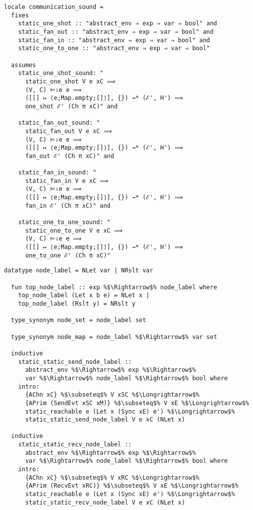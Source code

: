 \documentclass{article}
\begin{document}
\begin{lstlisting}[style=codestyle1, escapechar=\%]
locale communication_sound =
  fixes 
    static_one_shot :: "abstract_env ⇒ exp ⇒ var ⇒ bool" and
    static_fan_out :: "abstract_env ⇒ exp ⇒ var ⇒ bool" and 
    static_fan_in :: "abstract_env ⇒ exp ⇒ var ⇒ bool" and
    static_one_to_one :: "abstract_env ⇒ exp ⇒ var ⇒ bool"

  assumes 
    static_one_shot_sound: "
      static_one_shot V e xC ⟹
      (V, C) ⊨⇩e e ⟹
      ([[] ↦ ⟨e;Map.empty;[]⟩], {}) →* (ℰ', H') ⟹
      one_shot ℰ' (Ch π xC)" and

    static_fan_out_sound: "
      static_fan_out V e xC ⟹
      (V, C) ⊨⇩e e ⟹
      ([[] ↦ ⟨e;Map.empty;[]⟩], {}) →* (ℰ', H') ⟹
      fan_out ℰ' (Ch π xC)" and

    static_fan_in_sound: "
      static_fan_in V e xC ⟹
      (V, C) ⊨⇩e e ⟹
      ([[] ↦ ⟨e;Map.empty;[]⟩], {}) →* (ℰ', H') ⟹
      fan_in ℰ' (Ch π xC)" and

    static_one_to_one_sound: "
      static_one_to_one V e xC ⟹
      (V, C) ⊨⇩e e ⟹
      ([[] ↦ ⟨e;Map.empty;[]⟩], {}) →* (ℰ', H') ⟹
      one_to_one ℰ' (Ch π xC)"
  \end{lstlisting}



\begin{lstlisting}[style=codestyle1, escapechar=\%]
  datatype node_label = NLet var | NRslt var

  fun top_node_label :: exp %$\Rightarrow$% node_label where
    top_node_label (Let x b e) = NLet x |
    top_node_label (Rslt y) = NRslt y

  type_synonym node_set = node_label set

  type_synonym node_map = node_label %$\Rightarrow$% var set

  inductive
    static_static_send_node_label ::
      abstract_env %$\Rightarrow$% exp %$\Rightarrow$%
      var %$\Rightarrow$% node_label %$\Rightarrow$% bool where
    intro:
      {AChn xC} %$\subseteq$% V xSC %$\Longrightarrow$%
      {APrim (SendEvt xSC xM)} %$\subseteq$% V xE %$\Longrightarrow$%
      static_reachable e (Let x (Sync xE) e') %$\Longrightarrow$%
      static_static_send_node_label V e xC (NLet x)

  inductive
    static_static_recv_node_label ::
      abstract_env %$\Rightarrow$% exp %$\Rightarrow$%
      var %$\Rightarrow$% node_label %$\Rightarrow$% bool where
    intro:
      {AChn xC} %$\subseteq$% V xRC %$\Longrightarrow$%
      {APrim (RecvEvt xRC)} %$\subseteq$% V xE %$\Longrightarrow$%
      static_reachable e (Let x (Sync xE) e') %$\Longrightarrow$%
      static_static_recv_node_label V e xC (NLet x)

  \end{lstlisting}
\end{document}
